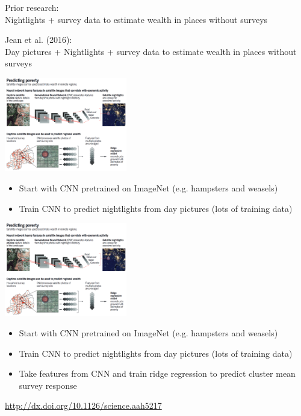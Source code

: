\documentclass[aspectratio=169]{beamer}
\begin{document}
\begin{frame}

Prior research:\\
Nightlights + survey data to estimate wealth in places without surveys

\end{frame}
\begin{frame}

Jean et al. (2016):\\
Day pictures + Nightlights + survey data to estimate wealth in places without surveys

\end{frame}
\begin{frame}

\begin{center}
\includegraphics[width=0.4\textwidth]{figures/blumenstock_fighting_2016_fig}
\end{center}

\begin{itemize}
\item Start with CNN pretrained on ImageNet (e.g. hampsters and weasels)
\pause
\item Train CNN to predict nightlights from day pictures (lots of training data)
\end{itemize}

\end{frame}
\begin{frame}

\begin{center}
\includegraphics[width=0.4\textwidth]{figures/blumenstock_fighting_2016_fig}
\end{center}

\begin{itemize}
\item Start with CNN pretrained on ImageNet (e.g. hampsters and weasels)
\item Train CNN to predict nightlights from day pictures (lots of training data)
\item Take features from CNN and train ridge regression to predict cluster mean survey response
\end{itemize}

\vfill

\url{http://dx.doi.org/10.1126/science.aah5217}
\end{frame}
\end{document}
